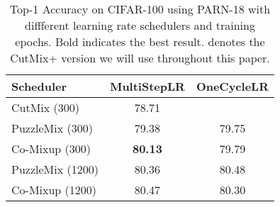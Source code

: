 \documentclass[letterpaper]{article} \usepackage[submission]{aaai23}  \usepackage{times}  \usepackage{helvet}  \usepackage{courier}  \usepackage[hyphens]{url}  \usepackage{graphicx} \urlstyle{rm} \def\UrlFont{\rm}  \usepackage{natbib}  \usepackage{caption} \frenchspacing  \setlength{\pdfpagewidth}{8.5in} \setlength{\pdfpageheight}{11in}
\newcommand{\cutmix}{{CutMix}}
\newcommand{\cifar}{CIFAR-100}
\begin{document}
\begin{table}[t!]
\centering
\begin{tabular}{lcc}
    \hline
    Scheduler & MultiStepLR & OneCycleLR \\ \hline
    CutMix (300) & 78.71 & \\ 
    PuzzleMix (300) & 79.38 & 79.75 \\ 
    Co-Mixup (300) & \textbf{80.13} & 79.79 \\ \hline
    PuzzleMix (1200) & 80.36 & 80.48 \\ 
    Co-Mixup (1200) &80.47 & 80.30 \\ \hline
  \end{tabular}


  \caption{Top-1 Accuracy on \cifar{} using PARN-18 with diffferent learning rate schedulers and training epochs. Bold indicates the best result.  denotes the \cutmix{}+ version we will use throughout this paper.}
  \label{tab:schedulersPARN}
\end{table}
 
\end{document}
